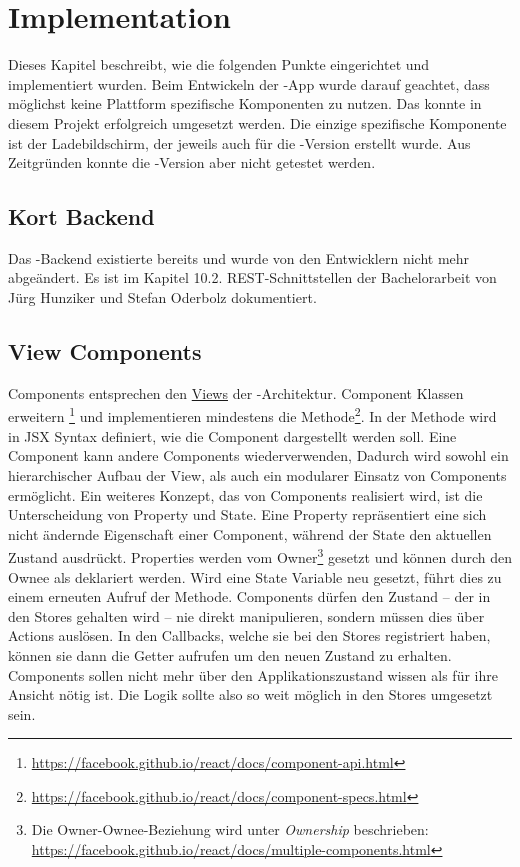 \chapter{Implementation}
\label{pd-implementation}
Dieses Kapitel beschreibt, wie die folgenden Punkte eingerichtet und implementiert wurden. 
Beim Entwickeln der -App wurde darauf geachtet, dass möglichst keine Plattform spezifische Komponenten zu nutzen. 
Das konnte in diesem Projekt erfolgreich umgesetzt werden. 
Die einzige spezifische Komponente ist der Ladebildschirm, der jeweils auch für die -Version erstellt wurde.
Aus Zeitgründen konnte die -Version aber nicht getestet werden. 


\section{Kort Backend}
Das \kort{}-Backend existierte bereits und wurde von den Entwicklern nicht mehr abgeändert. 
Es ist im Kapitel 10.2. \gls{REST}-Schnittstellen der Bachelorarbeit von Jürg Hunziker und Stefan Oderbolz dokumentiert.\cite{ba-kort-2012}

\section{View Components}
Components entsprechen den \hyperref[pd-flux-views]{Views} der -Architektur.
Component Klassen erweitern \footnote{\url{https://facebook.github.io/react/docs/component-api.html}} und implementieren mindestens die  Methode\footnote{\url{https://facebook.github.io/react/docs/component-specs.html}}. 
In der  Methode wird in \gls{JSX} Syntax definiert, wie die Component dargestellt werden soll.\newline
Eine Component kann andere Components wiederverwenden,
Dadurch wird sowohl ein hierarchischer Aufbau der View, als auch ein modularer Einsatz von Components  ermöglicht.\newline
Ein weiteres Konzept, das von Components realisiert wird, ist die Unterscheidung von Property und State.
Eine Property repräsentiert eine sich nicht ändernde Eigenschaft einer Component, während der State den aktuellen Zustand ausdrückt.
Properties werden vom Owner\footnote{Die Owner-Ownee-Beziehung wird unter \emph{Ownership} beschrieben: \url{https://facebook.github.io/react/docs/multiple-components.html}} gesetzt und können durch den Ownee als  deklariert werden.
Wird eine State Variable neu gesetzt, führt dies zu einem erneuten Aufruf der  Methode.\newline
Components dürfen den Zustand -- der in den Stores gehalten wird -- nie direkt manipulieren, sondern müssen dies über Actions auslösen.
In den Callbacks, welche sie bei den Stores registriert haben, können sie dann die Getter aufrufen um den neuen Zustand zu erhalten.
Components sollen nicht mehr über den Applikationszustand wissen als für ihre Ansicht nötig ist.
Die Logik sollte also so weit möglich in den Stores umgesetzt sein.\newline

